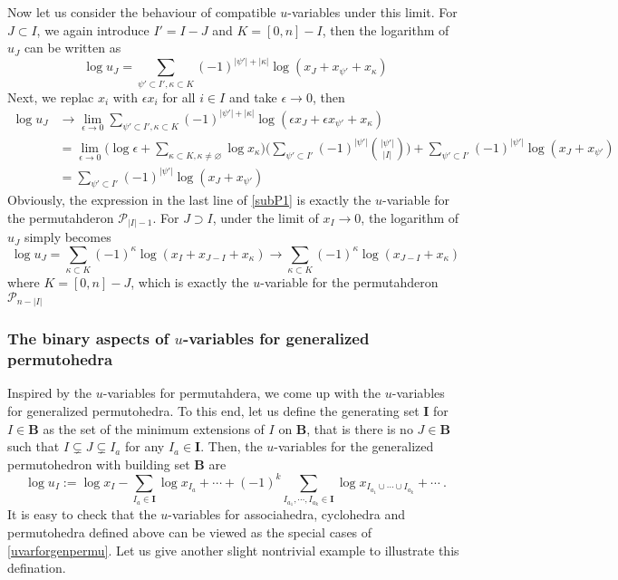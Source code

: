 \documentclass[hidelinks,12pt]{article}
\begin{document}
Now let us consider the behaviour of compatible $u$-variables under this limit. For $J\subset I$, we again introduce $I'=I-J$ and $K=[0,n]-I$, then the logarithm of $u_{J}$ can be written as 
\begin{equation}
     \log u_{J}=\sum_{\psi'\subset I', \kappa \subset K} (-1)^{\lvert \psi'\rvert +\lvert \kappa \rvert} \log (x_{J}+x_{\psi'}+x_{\kappa})
\end{equation}
Next, we replac $x_{i}$ with $ \epsilon x_{i}$ for all $i\in I$ and take $\epsilon \to 0$, then 
\begin{align}
   \log u_{J} &\to \lim_{\epsilon \to 0} \sum_{\psi'\subset I', \kappa \subset K} (-1)^{\lvert \psi'\rvert +\lvert \kappa \rvert} \log (\epsilon x_{J}+ \epsilon x_{\psi'}+x_{\kappa}) \nonumber  \\
    &=\lim_{\epsilon\to 0} \biggl(\log \epsilon+\sum_{\kappa\subset K,\kappa \neq \varnothing}\log x_{\kappa}\biggr)\Biggr( \sum_{\psi'\subset I'}(-1)^{\lvert\psi'\rvert}\binom{\lvert \psi' \rvert }{\lvert I \rvert }\Biggr)
    +\sum_{\psi'\subset I'} (-1)^{\lvert \psi'\rvert }\log (x_{J}+x_{\psi'}) \nonumber \\
    &=\sum_{\psi'\subset I'} (-1)^{\lvert \psi'\rvert }\log (x_{J}+x_{\psi'}) \label{subP1}
\end{align}
Obviously, the expression in the last line of \eqref{subP1} is exactly the $u$-variable for the permutahderon $\mathscr{P}_{\lvert I\rvert -1}$. For $J\supset I$, under the limit of $x_I\to 0$, the logarithm of $u_{J}$ simply becomes 
\begin{equation}
   \log u_{J} = \sum_{\kappa \subset K} (-1)^{\kappa} \log (x_{I}+x_{J-I}+x_{\kappa}) 
   \to  \sum_{\kappa \subset K} (-1)^{\kappa} \log (x_{J-I}+x_{\kappa}) 
\end{equation}
where $K=[0,n]-J$, which is exactly the $u$-variable for the permutahderon $\mathscr{P}_{n-\lvert I\rvert}$


\subsubsection{The binary aspects of $u$-variables for generalized permutohedra}

Inspired by the $u$-variables for permutahdera, we come up with the $u$-variables for generalized permutohedra. To this end, let us define the generating set $\mathbf{I}$ for $I\in\mathbf{B}$ as the set of the minimum extensions of $I$ on $\mathbf{B}$, that is there is no $J\in\mathbf{B}$ such that $I\subsetneq J\subsetneq I_{a}$ for any $I_{a}\in \mathbf{I}$. Then, the $u$-variables for the generalized permutohedron with building set $\mathbf{B}$ are 
\begin{equation}
   \log u_{I} :=  \log x_{I}- \sum_{I_{a}\in \mathbf{I}} \log x_{I_{a}}+\cdots +(-1)^{k}\sum _{I_{a_{1}},\cdots,I_{a_{k}}\in \mathbf{I}} \log x_{I_{a_{1}}\cup\cdots \cup I_{a_{k}}} +\cdots \:. \label{uvarforgenpermu}
\end{equation}
It is easy to check that the $u$-variables for associahedra, cyclohedra and permutohedra defined above can be viewed as the special cases of \eqref{uvarforgenpermu}. Let us give another slight nontrivial example to illustrate this defination.
\end{document}
